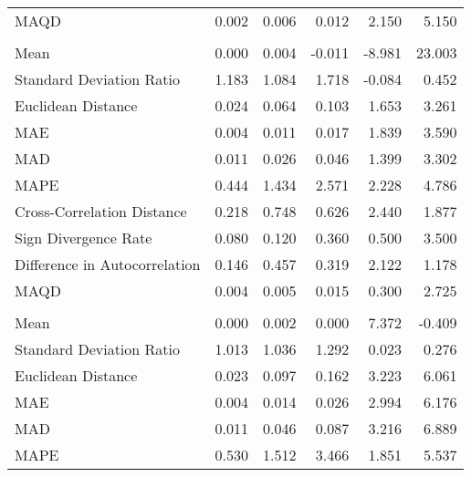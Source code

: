 \begin{landscape}
\begin{ThreePartTable}
\begin{longtable}[t]{lrrrrr}
\hspace{1em}MAQD & 0.002 & 0.006 & 0.012 & 2.150 & 5.150\\
\addlinespace[0.5em]
\multicolumn{6}{l}{\textbf{TUR}}\\
\hline
\hspace{1em}Mean & 0.000 & 0.004 & -0.011 & -8.981 & 23.003\\
\hspace{1em}Standard Deviation Ratio & 1.183 & 1.084 & 1.718 & -0.084 & 0.452\\
\hspace{1em}Euclidean Distance & 0.024 & 0.064 & 0.103 & 1.653 & 3.261\\
\hspace{1em}MAE & 0.004 & 0.011 & 0.017 & 1.839 & 3.590\\
\hspace{1em}MAD & 0.011 & 0.026 & 0.046 & 1.399 & 3.302\\
\hspace{1em}MAPE & 0.444 & 1.434 & 2.571 & 2.228 & 4.786\\
\hspace{1em}Cross-Correlation Distance & 0.218 & 0.748 & 0.626 & 2.440 & 1.877\\
\hspace{1em}Sign Divergence Rate & 0.080 & 0.120 & 0.360 & 0.500 & 3.500\\
\hspace{1em}Difference in Autocorrelation & 0.146 & 0.457 & 0.319 & 2.122 & 1.178\\
\hspace{1em}MAQD & 0.004 & 0.005 & 0.015 & 0.300 & 2.725\\
\addlinespace[0.5em]
\multicolumn{6}{l}{\textbf{UKR}}\\
\hline
\hspace{1em}Mean & 0.000 & 0.002 & 0.000 & 7.372 & -0.409\\
\hspace{1em}Standard Deviation Ratio & 1.013 & 1.036 & 1.292 & 0.023 & 0.276\\
\hspace{1em}Euclidean Distance & 0.023 & 0.097 & 0.162 & 3.223 & 6.061\\
\hspace{1em}MAE & 0.004 & 0.014 & 0.026 & 2.994 & 6.176\\
\hspace{1em}MAD & 0.011 & 0.046 & 0.087 & 3.216 & 6.889\\
\hspace{1em}MAPE & 0.530 & 1.512 & 3.466 & 1.851 & 5.537\\

\end{longtable}
\end{ThreePartTable}
\end{landscape}
